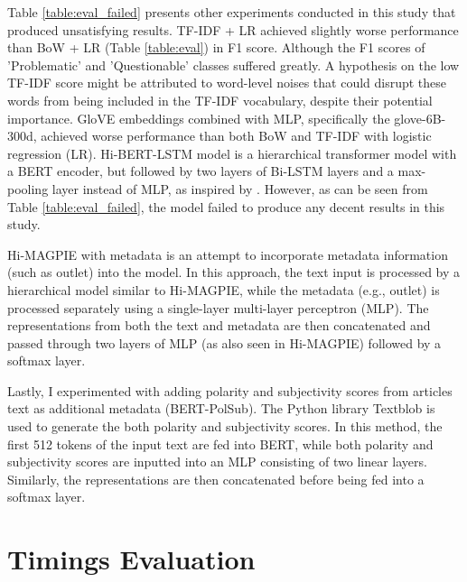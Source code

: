 Table \ref{table:eval_failed} presents other experiments conducted in this study that produced unsatisfying results. TF-IDF + LR achieved slightly worse performance than BoW + LR (Table \ref{table:eval}) in F1 score. Although the F1 scores of 'Problematic' and 'Questionable' classes suffered greatly. A hypothesis on the low TF-IDF score might be attributed to word-level noises that could disrupt these words from being included in the TF-IDF vocabulary, despite their potential importance. GloVE embeddings combined with MLP, specifically the glove-6B-300d, achieved worse performance than both BoW and TF-IDF with logistic regression (LR). Hi-BERT-LSTM model is a hierarchical transformer model with a BERT encoder, but followed by two layers of Bi-LSTM layers and a max-pooling layer instead of MLP, as inspired by \cite{khandve-2022-hierarchical-longdoc}. However, as can be seen from Table \ref{table:eval_failed}, the model failed to produce any decent results in this study.

Hi-MAGPIE with metadata is an attempt to incorporate metadata information (such as outlet) into the model. In this approach, the text input is processed by a hierarchical model similar to Hi-MAGPIE, while the metadata (e.g., outlet) is processed separately using a single-layer multi-layer perceptron (MLP). The representations from both the text and metadata are then concatenated and passed through two layers of MLP (as also seen in Hi-MAGPIE) followed by a softmax layer.

Lastly, I experimented with adding polarity and subjectivity scores from articles text as additional metadata (BERT-PolSub). The Python library Textblob \cite{loria-2018-textblob} is used to generate the both polarity and subjectivity scores. In this method, the first 512 tokens of the input text are fed into BERT, while both polarity and subjectivity scores are inputted into an MLP consisting of two linear layers. Similarly, the representations are then concatenated before being fed into a softmax layer.

\section{Timings Evaluation}


